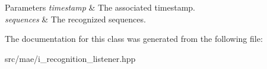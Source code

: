 \begin{DoxyParams}{Parameters}
{\em timestamp} & The associated timestamp. \\
\hline
{\em sequences} & The recognized sequences. \\
\hline
\end{DoxyParams}


The documentation for this class was generated from the following file\-:\begin{DoxyCompactItemize}
\item 
src/mae/i\-\_\-recognition\-\_\-listener.\-hpp\end{DoxyCompactItemize}
